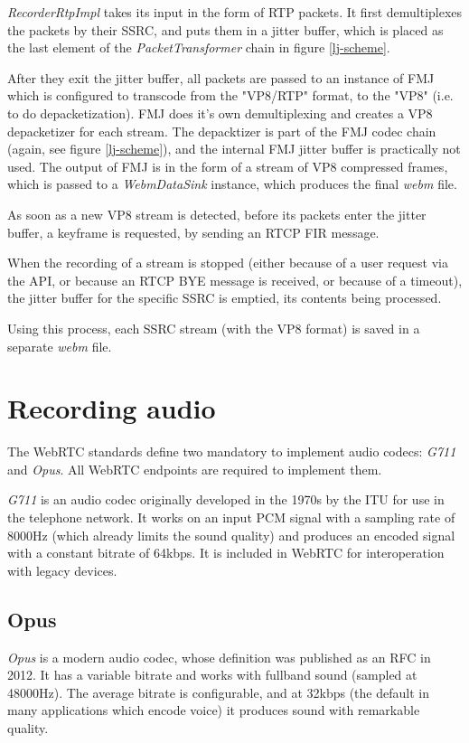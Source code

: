 \documentclass[twoside,openright,a4paper,12pt,english]{article}
\begin{document}
\emph{RecorderRtpImpl} takes its input in the form of RTP
packets. It first demultiplexes the packets by their SSRC, and puts them in a jitter
buffer, which is placed as the last element of the \emph{PacketTransformer} chain in figure \ref{lj-scheme}.

After they exit the jitter buffer, all packets
are passed to an instance of FMJ which is configured to transcode from the
"VP8/RTP" format, to the "VP8" (i.e. to do depacketization). FMJ does it's own
demultiplexing and creates a VP8 depacketizer for each stream. The depacktizer
is part of the FMJ codec chain (again, see figure \ref{lj-scheme}), and the
internal FMJ jitter buffer is practically not used. The output of FMJ is in the
form of a stream of VP8 compressed frames, which is passed to a
\emph{WebmDataSink} instance, which produces the final \emph{webm} file.

As soon as a new VP8 stream is detected, before its packets enter the jitter
buffer, a keyframe is requested, by sending an RTCP FIR message. 

When the recording of a stream is stopped (either because of a user request
via the API, or because an RTCP BYE message is received, or because of a
timeout), the jitter buffer for the specific SSRC is emptied, its contents
being processed.

Using this process, each SSRC stream (with the VP8 format) is saved in a
separate \emph{webm} file.




\section{Recording audio}
\label{recording-audio}
The WebRTC standards define two mandatory to implement audio codecs:
\emph{G711}\cite{g711} and \emph{Opus}\cite{opus}. All WebRTC endpoints are
required to implement them.

\emph{G711} is an audio codec originally developed in the 1970s by the ITU for
use in the telephone network. It works on an input PCM signal with a sampling
rate of 8000Hz (which already limits the sound quality) and produces an encoded
signal with a constant bitrate of 64kbps. It is included in WebRTC for interoperation
with legacy devices.

\subsection{Opus}
\emph{Opus} is a modern audio codec, whose definition was published as an RFC in 2012. It has a variable bitrate
and works with fullband sound (sampled at 48000Hz). The average bitrate is configurable,
and at 32kbps (the default in many applications which encode voice) it produces
sound with remarkable quality.
\end{document}
